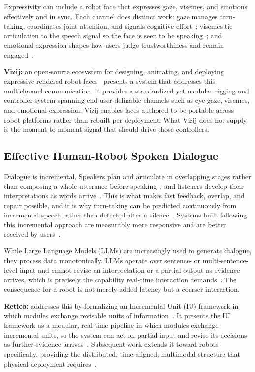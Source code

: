 \documentclass[conference]{IEEEtran}
\begin{document}
Expressivity can include a robot face that expresses gaze, visemes, and
emotions effectively and in sync. Each channel does distinct work: gaze
manages turn-taking, coordinates joint attention, and signals cognitive
effort~\cite{mishra2023gaze}; visemes tie articulation to the speech signal so
the face is seen to be speaking~\cite{edwards2016jali}; and emotional expression shapes how users judge trustworthiness and remain engaged~\cite{song2023robot}.

\textbf{Vizij:} an open-source ecosystem for designing, animating, and
deploying expressive rendered robot faces~\cite{elbeleidy2026vizij} presents a system that addresses this multichannel communication. It
provides a standardized yet modular rigging and controller system spanning
end-user definable channels such as eye gaze, visemes, and emotional
expression. Vizij enables faces authored to be portable across robot platforms
rather than rebuilt per deployment. What Vizij does not supply is the
moment-to-moment signal that should drive those controllers.

\subsection{Effective Human-Robot Spoken Dialogue}

Dialogue is incremental. Speakers plan and articulate in overlapping stages
rather than composing a whole utterance before speaking~\cite{levelt1989speaking},
and listeners develop their interpretations as words arrive~\cite{tanenhaus1995integration}. This is what
makes fast feedback, overlap, and repair possible, and it is why turn-taking
can be predicted continuously from incremental speech rather than
detected after a silence~\cite{skantze2021review, ekstedt2022vap}. Systems
built following this incremental approach are measurably more responsive and are better
received by users~\cite{baumann2011evaluation, kohn2018incremental}.

While Large Language Models (LLMs) are increasingly used to generate dialogue, they
process data monotonically. LLMs operate over sentence- or
multi-sentence-level input and cannot revise an interpretation or a partial
output as evidence arrives, which is precisely the capability real-time
interaction demands~\cite{kennington2025prior}. The consequence for a robot is
not merely added latency but a coarser interaction.

\textbf{Retico:} addresses this by formalizing an Incremental Unit (IU) framework in which
modules exchange revisable units of information~\cite{schlangen2011iu}. It presents the IU framework as a modular, real-time pipeline in which modules
exchange incremental units, so the system can act on partial input and revise
its decisions as further evidence arrives~\cite{michael2020retico, schlangen2011iu}. Subsequent work extends it toward robots specifically, providing the distributed,
time-aligned, multimodal structure that physical deployment
requires~\cite{kennington2020rrsds, kennington2025retico}.
\end{document}
